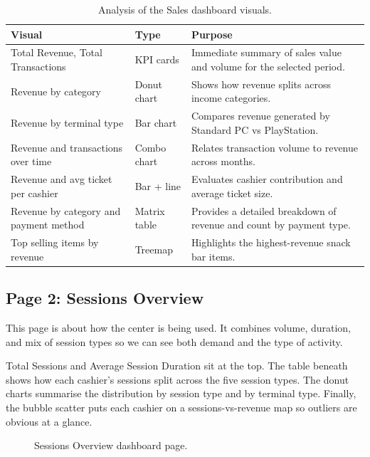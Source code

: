 \documentclass[12pt, a4paper]{report}
\begin{document}
\begin{table}[H]
  \centering
  \caption{Analysis of the Sales dashboard visuals.\label{tab:rev_analysis}}
  \begin{tabular}{p{3.5cm} p{2.5cm} p{7cm}}
    \toprule
    \textbf{Visual} & \textbf{Type} & \textbf{Purpose} \\
    \midrule
    Total Revenue, Total Transactions
      & KPI cards
      & Immediate summary of sales value and volume for the selected period. \\[4pt]
    Revenue by category
      & Donut chart
      & Shows how revenue splits across income categories. \\[4pt]
    Revenue by terminal type
      & Bar chart
      & Compares revenue generated by Standard PC vs PlayStation. \\[4pt]
    Revenue and transactions over time
      & Combo chart
      & Relates transaction volume to revenue across months. \\[4pt]
    Revenue and avg ticket per cashier
      & Bar + line
      & Evaluates cashier contribution and average ticket size. \\[4pt]
    Revenue by category and payment method
      & Matrix table
      & Provides a detailed breakdown of revenue and count by payment type. \\[4pt]
    Top selling items by revenue
      & Treemap
      & Highlights the highest-revenue snack bar items. \\
    \bottomrule
  \end{tabular}
\end{table}

\subsection{Page 2: Sessions Overview}

This page is about how the center is being used. It combines volume, duration, and
mix of session types so we can see both demand and the type of activity.

Total Sessions and Average Session Duration sit at the top. The table beneath
shows how each cashier's sessions split across the five session types. The donut
charts summarise the distribution by session type and by terminal type. Finally,
the bubble scatter puts each cashier on a sessions-vs-revenue map so outliers are
obvious at a glance.

\begin{figure}[H]
  \centering
  \caption{Sessions Overview dashboard page.\label{fig:dash_sessions}}
\end{figure}
\end{document}
